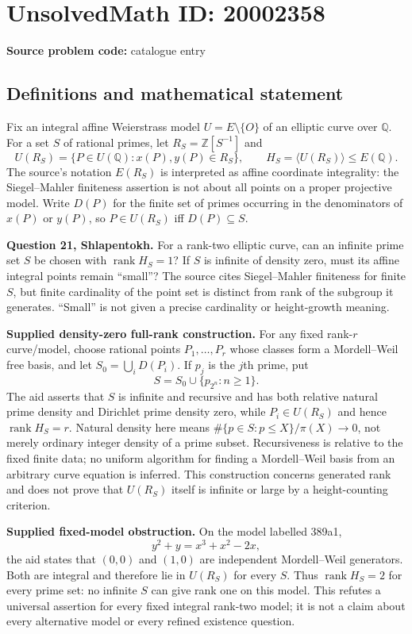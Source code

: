\documentclass[11pt]{article}
\newcommand{\Z}{\mathbb{Z}}
\newcommand{\Q}{\mathbb{Q}}
\begin{document}
\section*{UnsolvedMath ID: 20002358}
\textbf{Source problem code:} catalogue entry
\subsection{Definitions and mathematical statement}
Fix an integral affine Weierstrass model $U=E\setminus\{O\}$ of an elliptic curve over $\Q$. For a set $S$ of rational primes, let $R_S=\Z[S^{-1}]$ and
\[
 U(R_S)=\{P\in U(\Q):x(P),y(P)\in R_S\},\qquad
 H_S=\langle U(R_S)\rangle\le E(\Q).
\]
The source's notation $E(R_S)$ is interpreted as affine coordinate integrality: the Siegel--Mahler finiteness assertion is not about all points on a proper projective model. Write $D(P)$ for the finite set of primes occurring in the denominators of $x(P)$ or $y(P)$, so $P\in U(R_S)$ iff $D(P)\subseteq S$.

\textbf{Question 21, Shlapentokh.} For a rank-two elliptic curve, can an infinite prime set $S$ be chosen with $\operatorname{rank}H_S=1$? If $S$ is infinite of density zero, must its affine integral points remain ``small''? The source cites Siegel--Mahler finiteness for finite $S$, but finite cardinality of the point set is distinct from rank of the subgroup it generates. ``Small'' is not given a precise cardinality or height-growth meaning.

\textbf{Supplied density-zero full-rank construction.} For any fixed rank-$r$ curve/model, choose rational points $P_1,\ldots,P_r$ whose classes form a Mordell--Weil free basis, and let $S_0=\bigcup_iD(P_i)$. If $p_j$ is the $j$th prime, put
\[
 S=S_0\cup\{p_{2^n}:n\ge1\}.
\]
The aid asserts that $S$ is infinite and recursive and has both relative natural prime density and Dirichlet prime density zero, while $P_i\in U(R_S)$ and hence $\operatorname{rank}H_S=r$. Natural density here means $\#\{p\in S:p\le X\}/\pi(X)\to0$, not merely ordinary integer density of a prime subset. Recursiveness is relative to the fixed finite data; no uniform algorithm for finding a Mordell--Weil basis from an arbitrary curve equation is inferred. This construction concerns generated rank and does not prove that $U(R_S)$ itself is infinite or large by a height-counting criterion.

\textbf{Supplied fixed-model obstruction.} On the model labelled 389a1,
\[
 y^2+y=x^3+x^2-2x,
\]
the aid states that $(0,0)$ and $(1,0)$ are independent Mordell--Weil generators. Both are integral and therefore lie in $U(R_S)$ for every $S$. Thus $\operatorname{rank}H_S=2$ for every prime set: no infinite $S$ can give rank one on this model. This refutes a universal assertion for every fixed integral rank-two model; it is not a claim about every alternative model or every refined existence question.
\end{document}
